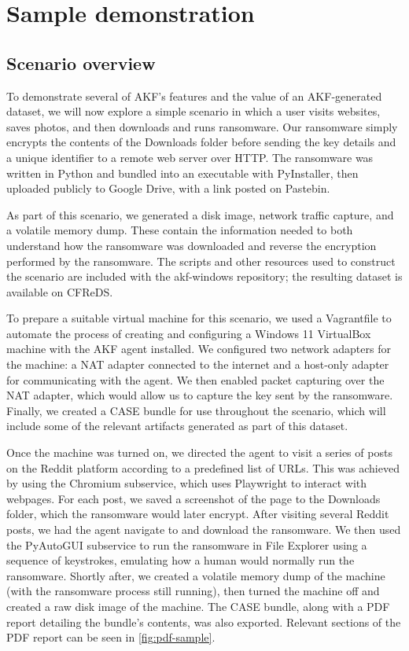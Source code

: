 \documentclass[final,5p,times,twocolumn]{elsarticle}
\begin{document}
\section{Sample demonstration}\label{sample-demonstration}

\subsection{Scenario overview}\label{scenario-overview}

To demonstrate several of AKF's features and the value of an
AKF-generated dataset, we will now explore a simple scenario in which a
user visits websites, saves photos, and then downloads and runs
ransomware. Our ransomware simply encrypts the contents of the Downloads
folder before sending the key details and a unique identifier to a
remote web server over HTTP. The ransomware was written in Python and
bundled into an executable with PyInstaller, then uploaded publicly to
Google Drive, with a link posted on Pastebin.

As part of this scenario, we generated a disk image, network traffic
capture, and a volatile memory dump. These contain the information
needed to both understand how the ransomware was downloaded and reverse
the encryption performed by the ransomware. The scripts and other
resources used to construct the scenario are included with the
akf-windows repository; the resulting dataset is available on CFReDS.

To prepare a suitable virtual machine for this scenario, we used a
Vagrantfile to automate the process of creating and configuring a
Windows 11 VirtualBox machine with the AKF agent installed. We
configured two network adapters for the machine: a NAT adapter connected
to the internet and a host-only adapter for communicating with the
agent. We then enabled packet capturing over the NAT adapter, which
would allow us to capture the key sent by the ransomware. Finally, we
created a CASE bundle for use throughout the scenario, which will
include some of the relevant artifacts generated as part of this
dataset.

Once the machine was turned on, we directed the agent to visit a series
of posts on the Reddit platform according to a predefined list of URLs.
This was achieved by using the Chromium subservice, which uses
Playwright to interact with webpages. For each post, we saved a
screenshot of the page to the Downloads folder, which the ransomware
would later encrypt. After visiting several Reddit posts, we had the
agent navigate to and download the ransomware. We then used the
PyAutoGUI subservice to run the ransomware in File Explorer using a
sequence of keystrokes, emulating how a human would normally run the
ransomware. Shortly after, we created a volatile memory dump of the
machine (with the ransomware process still running), then turned the
machine off and created a raw disk image of the machine. The CASE
bundle, along with a PDF report detailing the bundle's contents, was
also exported. Relevant sections of the PDF report can be seen in
\autoref{fig:pdf-sample}.
\end{document}
